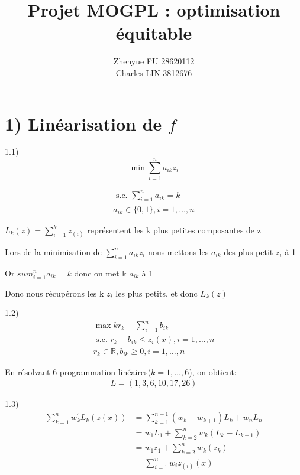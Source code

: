 \documentclass[11pt,A4,french]{article}
\title{Projet MOGPL : optimisation équitable }
\author{Zhenyue FU 28620112\\Charles LIN 3812676}
\date{}
\newcommand{\R}{\mathbb{R}}
\begin{document}
\maketitle
\section*{1) Linéarisation de $f$}

1.1)
$$
\min \sum_{i=1}^{n} a_{i k} z_{i}
$$

$$
\begin{gathered}
\text { s.c. } \sum_{i=1}^{n} a_{i k}=k \\
a_{i k} \in\{0,1\}, i=1, \ldots, n
\end{gathered}
$$

$L_{k}(z)=\sum_{i=1}^{k} z_{(i)}$ représentent les k plus petites composantes de z

Lors de la minimisation de $\sum_{i=1}^{n} a_{i k} z_{i}$ nous mettons les $a_{i k}$ des plus petit $z_{i}$ à 1

Or $sum_{i=1}^{n} a_{i k}=k$ donc on met k $a_{i k}$ à 1

Donc nous récupérons les k $z_{i}$ les plus petits, et donc $L_{k}(z)$


1.2)
$$
\begin{gathered}
\max k r_{k}-\sum_{i=1}^{n} b_{i k} \\
\text { s.c. }
r_{k}-b_{i k} \leq z_{i}(x), i=1, \ldots, n \\
r_k \in \R, b_{i k} \geq 0, i=1, \ldots, n
\end{gathered}
$$

En résolvant 6 programmation linéaires($k=1,\ldots,6$), on obtient:
\begin{align*}
L = (1,3,6,10,17,26)
\end{align*}


1.3)
\begin{equation*} 
\begin{split} 
\sum_{k=1}^{n} w_{k}^{\prime} L_{k}(z(x)) & = \sum_{k=1}^{n-1} (w_k-w_{k+1})L_k + w_nL_n \\
     & = w_1L_1 + \sum_{k=2}^n w_k(L_k-L_{k-1}) \\
     & = w_1z_{1} + \sum_{k=2}^n w_k(z_{k}) \\
     & = \sum_{i=1}^{n} w_{i} z_{(i)}(x) \\
\end{split}
\end{equation*}
\end{document}
